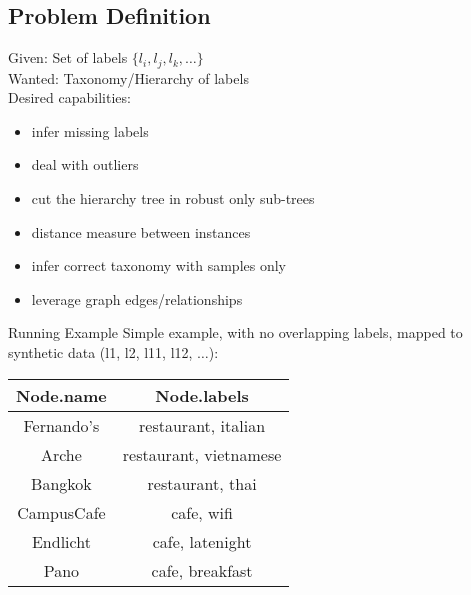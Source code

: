 \documentclass[rgb]{beamer}
\begin{document}
    \subsection{Problem Definition}
        \begin{frame}[t]
            \subsectionpage
            Given: Set of labels $\{ l_i, l_j, l_k, \dots \}$ \\
            Wanted: Taxonomy/Hierarchy of labels  \\
            \vspace{1cm}
                    Desired capabilities:
            \begin{itemize}
                \item infer missing labels
                \item deal with outliers 
                \item cut the hierarchy tree in robust only sub-trees
                \item distance measure between instances
                \item infer correct taxonomy with samples only
                \item leverage graph edges/relationships
            \end{itemize}
        \end{frame}
        
        \begin{frame}[t]{Running Example}
        Simple example, with no overlapping labels, mapped to synthetic data (l1, l2, l11, l12, $\dots$):\\
        
        \vspace{1cm}
        
        \centering\begin{tabular}{|c|c|} \hline
             Node.name & Node.labels \\ \hline
            Fernando's & restaurant, italian \\ \hline
            Arche & restaurant, vietnamese \\ \hline
            Bangkok & restaurant, thai \\ \hline
            CampusCafe & cafe, wifi \\ \hline
            Endlicht & cafe, latenight \\ \hline
            Pano & cafe, breakfast \\ \hline
        \end{tabular}
        \end{frame}{}
\end{document}
